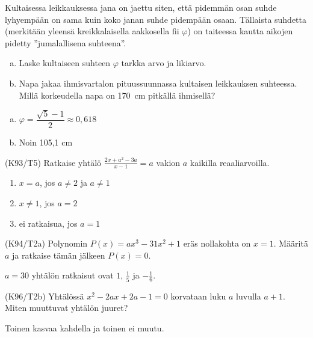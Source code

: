 \begin{tehtava}
    Kultaisessa leikkauksessa jana on jaettu siten, että pidemmän osan suhde lyhyempään on sama kuin koko janan suhde pidempään osaan. Tällaista suhdetta (merkitään yleensä kreikkalaisella aakkosella fii $\varphi$) on taiteessa kautta aikojen pidetty ''jumalallisena suhteena''.
		\begin{enumerate}[a)]
            \item Laske kultaiseen suhteen $\varphi$ tarkka arvo ja likiarvo.
            \item Napa jakaa ihmisvartalon pituussuunnassa kultaisen leikkauksen suhteessa. Millä korkeudella napa on 170~cm pitkällä ihmisellä?
        \end{enumerate}
    \begin{vastaus}
        \begin{enumerate}[a)]
            \item $ \varphi = \dfrac{\sqrt{5}-1}{2} \approx 0,618$
            \item Noin 105,1 cm
        \end{enumerate}
    \end{vastaus}
\end{tehtava}
\begin{tehtava}
(K93/T5) Ratkaise yhtälö
        $\frac{2x+a^2-3a}{x-1}=a$ vakion $a$ kaikilla reaaliarvoilla.
\begin{vastaus}
        \begin{enumerate}
         \item{$x=a$, jos $a \neq 2$ ja $a \neq 1$}
         \item{$x\neq 1$, jos $a=2$}
         \item{ei ratkaisua, jos $a=1$}
        \end{enumerate}
    \end{vastaus}
\end{tehtava}
\begin{tehtava}
(K94/T2a) Polynomin $P(x)=ax^3-31x^2+1$ eräs nollakohta on $x=1$. Määritä $a$ ja ratkaise tämän jälkeen $P(x)=0$.
\begin{vastaus}
      $a=30$ yhtälön ratkaisut ovat $1$, $\frac{1}{5}$ ja $-\frac{1}{6}$.
    \end{vastaus}
\end{tehtava}
\begin{tehtava}
(K96/T2b) Yhtälössä $x^2-2ax+2a-1=0$ korvataan luku $a$ luvulla $a+1$. Miten muuttuvat yhtälön juuret?
\begin{vastaus}
     Toinen kasvaa kahdella ja toinen ei muutu.
    \end{vastaus}
\end{tehtava}


